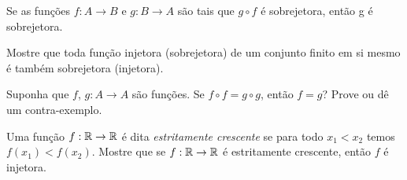 \documentclass[12pt]{exam}
\begin{document}
    \questao{} Se as fun{\c c}{\~o}es $f : A \to B$ e $g : B\to A$ s{\~a}o
    tais que $g\circ f$ {\'e} sobrejetora, ent{\~a}o g {\'e} sobrejetora.

    \vspace{.3cm}

    \questao{} Mostre que toda fun{\c c}{\~a}o injetora (sobrejetora) de um conjunto finito em si mesmo {\'e} tamb{\'e}m sobrejetora (injetora).

    \vspace{.3cm}

    \questao{} Suponha que $f$, $g : A \to A$ são funções. Se $f \circ f = g \circ g$, então $f = g$? Prove ou dê um contra-exemplo.

    \vspace{.3cm}

    \questao{} Uma função $f : \mathbb{R} \to \mathbb{R}$ é dita \textit{estritamente crescente} se para todo $x_1 < x_2$ temos $f(x_1) < f(x_2)$. Mostre que se $f : \mathbb{R} \to \mathbb{R}$ é estritamente crescente, então $f$ é injetora.
\end{document}
